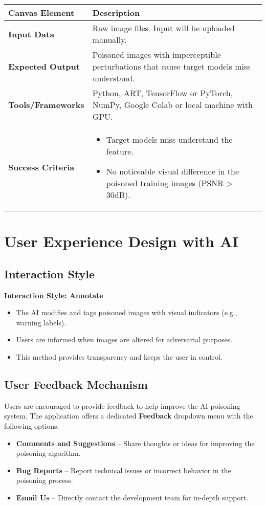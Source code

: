 \begin{table}[h]
\centering
\begin{tabular}{|p{4cm}|p{10cm}|}
\hline
\textbf{Canvas Element} & \textbf{Description} \\
\hline
\textbf{Input Data} & Raw image files. Input will be uploaded manually. \\
\hline
\textbf{Expected Output} & Poisoned images with imperceptible perturbations that cause target models miss understand. \\
\hline
\textbf{Tools/Frameworks} & Python, ART, TensorFlow or PyTorch, NumPy, Google Colab or local machine with GPU. \\
\hline
\textbf{Success Criteria} & 
\begin{itemize}
    \item Target models miss understand the feature.
    \item No noticeable visual difference in the poisoned training images (PSNR > 30dB).
\end{itemize} \\
\hline
\end{tabular}
\end{table}

\section{User Experience Design with AI}
\label{section:user-experience-design-with-AI}


\subsection{Interaction Style}
\textbf{Interaction Style: Annotate}

\begin{itemize}
    \item The AI modifies and tags poisoned images with visual indicators (e.g., warning labels).
    \item Users are informed when images are altered for adversarial purposes.
    \item This method provides transparency and keeps the user in control.
\end{itemize}

\subsection{User Feedback Mechanism}
Users are encouraged to provide feedback to help improve the AI poisoning system. The application offers a dedicated \textbf{Feedback} dropdown menu with the following options:
\begin{itemize}
    \item \textbf{Comments and Suggestions} – Share thoughts or ideas for improving the poisoning algorithm.
    \item \textbf{Bug Reports} – Report technical issues or incorrect behavior in the poisoning process.
    \item \textbf{Email Us} – Directly contact the development team for in-depth support.
\end{itemize}

